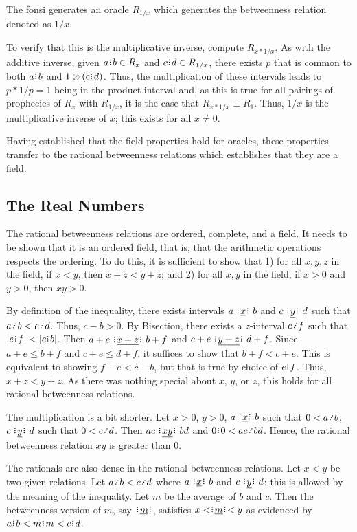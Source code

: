 \documentclass[12pt]{article}
\begin{document}
\begin{enumerate}
    The fonsi generates an oracle $R_{1/x}$ which generates the betweenness relation denoted as $1/x$. 

    To verify that this is the multiplicative inverse, compute $R_{x*1/x}$. As with the additive inverse, given $a\rint b \in R_x$ and $c\rint d \in R_{1/x}$, there exists $p$ that is common to both $a\rint b$ and $1 \oslash (c\rint d)$. Thus, the multiplication of these intervals leads to $p *1/p = 1$ being in the product interval and, as this is true for all pairings of prophecies of $R_{x}$ with $R_{1/x}$, it is the case that $R_{x*1/x} \equiv R_1$. Thus, $1/x$ is the multiplicative inverse of $x$; this exists for all $x \neq 0$. 

\end{enumerate}

Having established that the field properties hold for oracles, these properties transfer to the rational betweenness relations which establishes that they are a field. 


\subsection{The Real Numbers}

The rational betweenness relations are ordered, complete, and a field. It needs to be shown that it is an ordered field, that is, that the arithmetic operations respects the ordering. To do this, it is sufficient to show that 1) for all $x, y, z$ in the field, if $x<y$, then $x + z < y +z$; and 2) for all $x, y$ in the field, if $x >0$ and $y>0$, then $xy > 0 $.

By definition of the inequality, there exists intervals $ a \xrel[x] b$ and $c \xrel[y] d$ such that $a \lte b < c \lte d$. Thus, $c-b > 0$. By Bisection, there exists a $z$-interval $e \lte f$ such that $|e\rint f| < |c\rint b|$. Then $a+e \xrel[x+z] b+f$ and $c+e \xrel[y+z] d+f$. Since $a+e \leq  b+f$ and $c+e \leq d+f$, it suffices to show that $b+f < c+e$. This is equivalent to showing $f-e < c-b$, but that is true by choice of $e\rint f$. Thus, $x+z < y+z$. As there was nothing special about $x$, $y$, or $z$, this holds for all rational betweenness relations. 

The multiplication is a bit shorter. Let $x >0 $, $y >0$, $a \xrel b$ such that $0<a \lte b$, $c \xrel[y] d$ such that $0 < c \lte d$. Then $ac \xrel[xy] bd$ and $0\rint 0 < ac \lte bd$. Hence, the rational betweenness relation $xy$ is greater than 0. 

The rationals are also dense in the rational betweenness relations. Let $x < y$ be two given relations. Let $a \lte b < c \lte d$ where $a \xrel b$ and $c \xrel[y] d$; this is allowed by the meaning of the inequality. Let $m$ be the average of $b$ and $c$. Then the betweenness version of $m$, say $\xrel[m]$, satisfies $x < \xrel[m] < y$ as evidenced by $a\rint b < m\rint m < c\rint d$.
\end{document}
